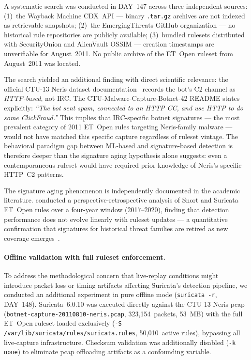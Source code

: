 \documentclass[11pt,a4paper]{article}
\begin{document}
    A systematic search was conducted in DAY~147 across three independent sources: (1)~the
    Wayback Machine CDX~API --- binary \texttt{.tar.gz} archives are not indexed as
    retrievable snapshots; (2)~the EmergingThreats GitHub organization --- no historical
    rule repositories are publicly available; (3)~bundled rulesets distributed with
    SecurityOnion and AlienVault OSSIM --- creation timestamps are unverifiable for
    August~2011. No public archive of the ET~Open ruleset from August~2011 was located.

    The search yielded an additional finding with direct scientific relevance: the
    official CTU-13 Neris dataset documentation~\cite{garcia2014} records the bot's C2
    channel as \emph{HTTP-based}, not IRC. The CTU-Malware-Capture-Botnet-42 README states explicitly:
    \emph{``The bot sent spam, connected to an HTTP CC, and use HTTP to do some
    ClickFraud.''} This implies that IRC-specific botnet signatures --- the most
    prevalent category of 2011 ET~Open rules targeting Neris-family malware --- would
    not have matched this specific capture regardless of ruleset vintage. The behavioral
    paradigm gap between ML-based and signature-based detection is therefore deeper than
    the signature aging hypothesis alone suggests: even a contemporaneous ruleset would
    have required prior knowledge of Neris's specific HTTP~C2 patterns.

    The signature aging phenomenon is independently documented in the academic
    literature. \citet{asad2023perspective} conducted a perspective-retrospective
    analysis of Snort and Suricata ET~Open rules over a four-year window (2017--2020),
    finding that detection performance does not evolve linearly with ruleset updates ---
    a quantitative confirmation that signatures for historical threat families are retired
    as new coverage emerges~\cite{asad2023perspective}.

    \paragraph{Offline validation with full ruleset enforcement.}
    To address the methodological concern that live-replay conditions might introduce
    packet loss or timing artifacts affecting Suricata's detection pipeline, we conducted
    an additional experiment in pure offline mode (\texttt{suricata -r}, DAY~148).
    Suricata~6.0.10 was executed directly against the CTU-13 Neris pcap
    (\texttt{botnet-capture-20110810-neris.pcap}, 323,154~packets, 53~MB) with the full
    ET~Open ruleset loaded exclusively (\texttt{-S /var/lib/suricata/rules/suricata.rules},
    50,010~active rules), bypassing all live-capture infrastructure. Checksum validation
    was additionally disabled (\texttt{-k none}) to eliminate pcap offloading artifacts as
    a confounding variable.
\end{document}
